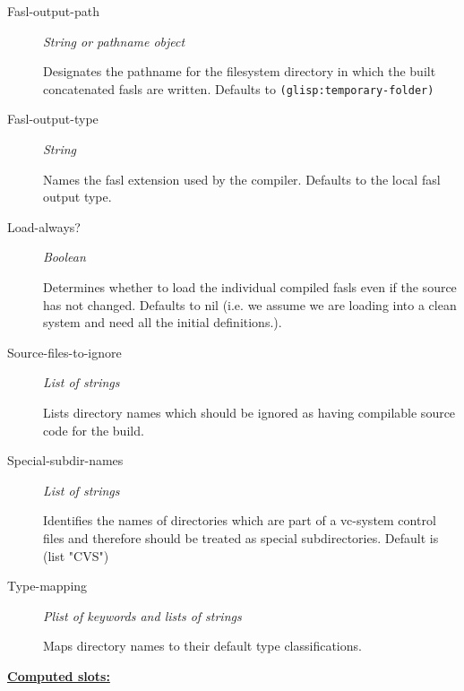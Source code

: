 \documentclass [11pt]{book}
\begin{document}
\begin{itemize}
\begin{description}
\item [Fasl-output-path]
\emph{String or pathname object}

 Designates the pathname for the filesystem directory in which
the built concatenated fasls are written. Defaults to \texttt{(glisp:temporary-folder)}




\item [Fasl-output-type]
\emph{String}

 Names the fasl extension used by the compiler. Defaults to the local fasl output type.




\item [Load-always?]
\emph{Boolean}

 Determines whether to load the individual compiled fasls even if the source has not changed.
Defaults to nil (i.e. we assume we are loading into a clean system and need all the initial definitions.).




\item [Source-files-to-ignore]
\emph{List of strings}

 Lists directory names which should be ignored as having
compilable source code for the build.




\item [Special-subdir-names]
\emph{List of strings}

 Identifies the names of directories which are part of a vc-system control files
and therefore should be treated as special subdirectories.
Default is (list "CVS")




\item [Type-mapping]
\emph{Plist of keywords and lists of strings}

 Maps directory names to their default type classifications.




\end{description}






\textbf{
\underline{Computed slots:}}


\end{itemize}
\end{document}
